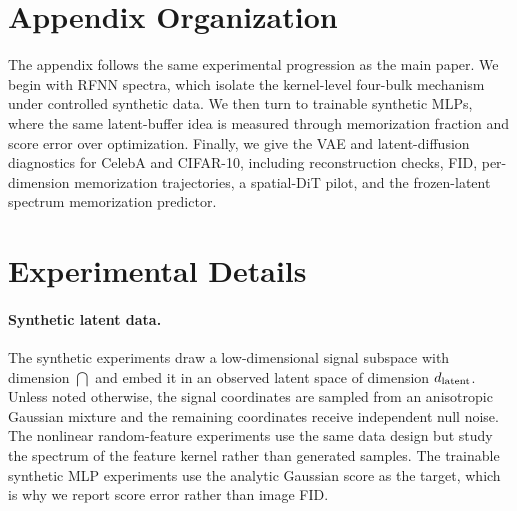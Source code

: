 \section{Appendix Organization}

The appendix follows the same experimental progression as the main paper. We
begin with RFNN spectra, which isolate the kernel-level four-bulk mechanism
under controlled synthetic data. We then turn to trainable synthetic MLPs,
where the same latent-buffer idea is measured through memorization fraction and
score error over optimization. Finally, we give the VAE and latent-diffusion
diagnostics for CelebA and CIFAR-10, including reconstruction checks, FID,
per-dimension memorization trajectories, a spatial-DiT pilot, and the
frozen-latent spectrum memorization predictor.

\section{Experimental Details}
\label{app:protocol}
\label{app:methods}

\paragraph{Synthetic latent data.}
The synthetic experiments draw a low-dimensional signal subspace with
dimension $\dint$ and embed it in an observed latent space of dimension
$d_{\mathrm{latent}}$. Unless noted otherwise, the signal coordinates are sampled from an
anisotropic Gaussian mixture and the remaining coordinates receive independent
null noise. The nonlinear random-feature experiments use the same data design
but study the spectrum of the feature kernel rather than generated samples.
The trainable synthetic MLP experiments use the analytic Gaussian score as the
target, which is why we report score error rather than image FID.

